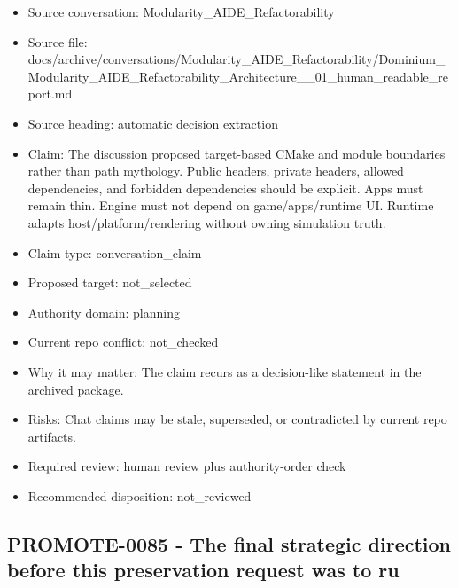 \documentclass[11pt,a4paper]{report}
\begin{document}
\begin{itemize}
\item Source conversation: Modularity\_AIDE\_Refactorability
\item Source file: docs/archive/conversations/Modularity\_AIDE\_Refactorability/Dominium\_Modularity\_AIDE\_Refactorability\_Architecture\_\_01\_human\_readable\_report.md
\item Source heading: automatic decision extraction
\item Claim: The discussion proposed target-based CMake and module boundaries rather than path mythology. Public headers, private headers, allowed dependencies, and forbidden dependencies should be explicit. Apps must remain thin. Engine must not depend on game/apps/runtime UI. Runtime adapts host/platform/rendering without owning simulation truth.
\item Claim type: conversation\_claim
\item Proposed target: not\_selected
\item Authority domain: planning
\item Current repo conflict: not\_checked
\item Why it may matter: The claim recurs as a decision-like statement in the archived package.
\item Risks: Chat claims may be stale, superseded, or contradicted by current repo artifacts.
\item Required review: human review plus authority-order check
\item Recommended disposition: not\_reviewed
\end{itemize}

\subsection{PROMOTE-0085 - The final strategic direction before this preservation request was to ru}
\end{document}
